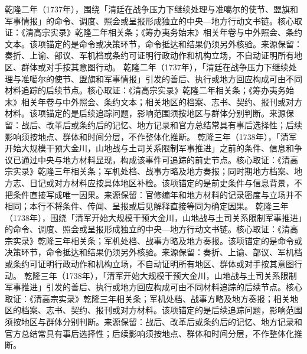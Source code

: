 乾隆二年（1737年），围绕「清廷在战争压力下继续处理与准噶尔的使节、盟旗和军事情报」的命令、调度、照会或呈报形成独立的中央—地方行动文书链。核心取证：《清高宗实录》乾隆二年相关条；《筹办夷务始末》相关年卷与中外照会、条约文本。该项锚定的是命令或决策环节，命令抵达和结果仍须另外核验。来源保留：奏折、上谕、部议、军机档或条约可证明行政动作和机构立场，不自动证明所有地区、群体或对手按其意图行动。
乾隆二年（1737年），「清廷在战争压力下继续处理与准噶尔的使节、盟旗和军事情报」引发的善后、执行或地方回应构成可由不同材料追踪的后续节点。核心取证：《清高宗实录》乾隆二年相关条；《筹办夷务始末》相关年卷与中外照会、条约文本；相关地区的档案、志书、契约、报刊或对方材料。该项锚定的是后续追踪问题，影响范围须按地区与群体分别判断。来源保留：战后、改革后或条约后的记忆、地方记录和官方总结常具有事后选择性；后续影响须按地点、群体和时间分层，不作整体化推断。
乾隆三年（1738年），「清军开始大规模干预大金川，山地战与土司关系限制军事推进」之前的条件、信息和争议已通过中央与地方材料显现，构成该事件可追踪的前史节点。核心取证：《清高宗实录》乾隆三年相关条；军机处档、战事方略及地方奏报；同时期地方档案、地方志、日记或对方材料应按具体地区补检。该项锚定的是前史条件与信息背景，不把条件直接写成唯一因果。来源保留：官修编年和地方材料的记录密度与立场并不相同；本行不将条件、传闻、呈报或后见解释直接等同为确定因果。
乾隆三年（1738年），围绕「清军开始大规模干预大金川，山地战与土司关系限制军事推进」的命令、调度、照会或呈报形成独立的中央—地方行动文书链。核心取证：《清高宗实录》乾隆三年相关条；军机处档、战事方略及地方奏报。该项锚定的是命令或决策环节，命令抵达和结果仍须另外核验。来源保留：奏折、上谕、部议、军机档或条约可证明行政动作和机构立场，不自动证明所有地区、群体或对手按其意图行动。
乾隆三年（1738年），「清军开始大规模干预大金川，山地战与土司关系限制军事推进」引发的善后、执行或地方回应构成可由不同材料追踪的后续节点。核心取证：《清高宗实录》乾隆三年相关条；军机处档、战事方略及地方奏报；相关地区的档案、志书、契约、报刊或对方材料。该项锚定的是后续追踪问题，影响范围须按地区与群体分别判断。来源保留：战后、改革后或条约后的记忆、地方记录和官方总结常具有事后选择性；后续影响须按地点、群体和时间分层，不作整体化推断。
